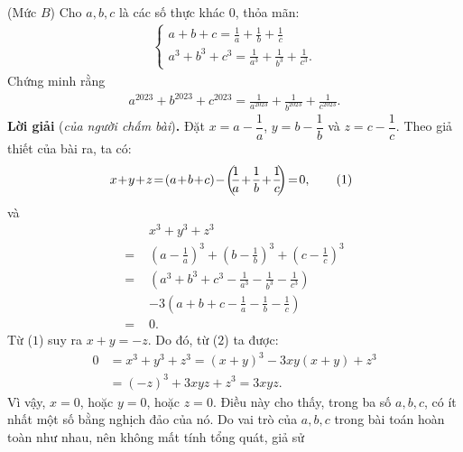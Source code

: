\begin{multicols}{2}
	{}
	(Mức $B$)
	Cho $a, b, c$ là các số thực khác $0$, thỏa mãn:
	\begin{align*}
		\begin{cases}
			a + b + c = \frac{1}{a} + \frac{1}{b} + \frac{1}{c}\\
			{a^3} + {b^3} + {c^3} = \frac{1}{{{a^3}}} + \frac{1}{{{b^3}}} + \frac{1}{{{c^3}}}.
		\end{cases}
	\end{align*}
	Chứng minh rằng
	\begin{align*}
		{a^{2023}} \!+\! {b^{2023}} \!+\! {c^{2023}} \!=\! \frac{1}{{{a^{2023}}}} \!+\! \frac{1}{{{b^{2023}}}} \!+\! \frac{1}{{{c^{2023}}}}.
	\end{align*}
	\textbf{\color{thachthuctoanhoc}Lời giải} (\textit{của người chấm bài})\textbf{\color{thachthuctoanhoc}.}
	\vskip 0.05cm
	Đặt $x = a - \dfrac{1}{a}$, $y = b - \dfrac{1}{b}$  và $z = c - \dfrac{1}{c}$.
	\vskip 0.05cm
	Theo giả thiết của bài ra, ta có:
	\begin{align*}
		\hspace*{-5pt}x \!+\! y \!+\! z \!=\! \left( {a \!+\! b \!+\! c} \right) \!-\! \left(\!\! {\frac{1}{a} \!+\! \frac{1}{b} \!+\! \frac{1}{c}} \!\!\right) \!=\! 0, \tag{$1$}
	\end{align*}
	và
	\begin{align*}
		&{x^3} + {y^3} + {z^3} \\
		= \,&{\left( {a - \frac{1}{a}} \right)^3} + {\left( {b - \frac{1}{b}} \right)^3} + {\left( {c - \frac{1}{c}} \right)^3}\\
		= \,&\left( {{a^3} + {b^3} + {c^3} - \frac{1}{{{a^3}}} - \frac{1}{{{b^3}}} - \frac{1}{{{c^3}}}} \right) \\
		&- 3\left( {a + b + c - \frac{1}{a} - \frac{1}{b} - \frac{1}{c}} \right)\\
		 = \,\,& 0.\tag{$2$}
	\end{align*}
	Từ ($1$) suy ra $x + y = -z$. Do đó, từ ($2$) ta được:
	\begin{align*}
		0 &= {x^3} \!+\! {y^3} \!+\! {z^3} = {\left( {x \!+\! y} \right)^3} \!-\! 3xy\left( {x \!+\! y} \right) \!+\! {z^3} \\
		&= {\left( { - z} \right)^3} + 3xyz + {z^3} = 3xyz.
	\end{align*}
	Vì vậy, $x = 0$, hoặc $y = 0$, hoặc $z = 0$. Điều này cho thấy, trong ba số $a, b, c$, có ít nhất một số bằng nghịch đảo của nó.
	\vskip 0.05cm
	Do vai trò của $a, b, c$ trong bài toán hoàn toàn như nhau, nên không mất tính tổng quát, giả sử

\end{multicols}
